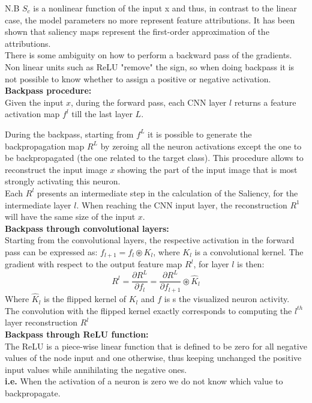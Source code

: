 N.B $S_c$ is a nonlinear function of the input x and thus, in contrast to the linear case, the model parameters no more represent feature attributions. It has been shown that saliency maps represent the first-order approximation of the attributions.\\

There is some ambiguity on how to perform a backward pass of the gradients. Non linear units such as ReLU "remove" the sign, so when doing backpass it is not possible
to know whether to assign a positive or negative activation.\\

\textbf{Backpass procedure:}\\
Given the input $x$, during the forward pass, each CNN layer $l$ returns a feature activation map $f^l$ till the last layer $L$.

During the backpass, starting from $f^L$ it is possible to generate the backpropagation map $R^L$ by zeroing all the neuron activations except the one to be backpropagated (the one related to the
target class). This procedure allows to reconstruct the input image $x$ showing the part of the
input image that is most strongly activating this neuron.\\

Each $R^l$ presents an intermediate step in the calculation of the Saliency, for the intermediate
layer $l$. When reaching the CNN input layer, the reconstruction $R^1$ will have the same size of the input $x$.\\

\textbf{Backpass through convolutional layers:}\\
Starting from the convolutional layers, the respective activation in the forward pass can be expressed as: $f_{l+1}=f_l \circledast K_l$, where $K_l$ is a convolutional kernel. The gradient with respect to the output feature map $R^l$, for layer $l$ is then:
\begin{equation*}
    R^l = \frac{\partial R^{L}}{\partial f_l}=\frac{\partial R^{L}}{\partial f_{l+1}}\circledast \hat{K}_l
\end{equation*}
Where $\hat{K}_l$ is the flipped kernel of $K_l$ and $f$ is s the visualized neuron activity.\\
The convolution with the flipped kernel exactly corresponds to computing the $l^{th}$ layer reconstruction $R^l$\\

\textbf{Backpass through ReLU function:}\\
The ReLU is a piece-wise linear function that is defined to be zero for all negative values of the
node input and one otherwise, thus keeping unchanged the positive input values while annihilating
the negative ones.\\
\textbf{i.e.} When the activation of a neuron is zero we do not know which value to backpropagate.

